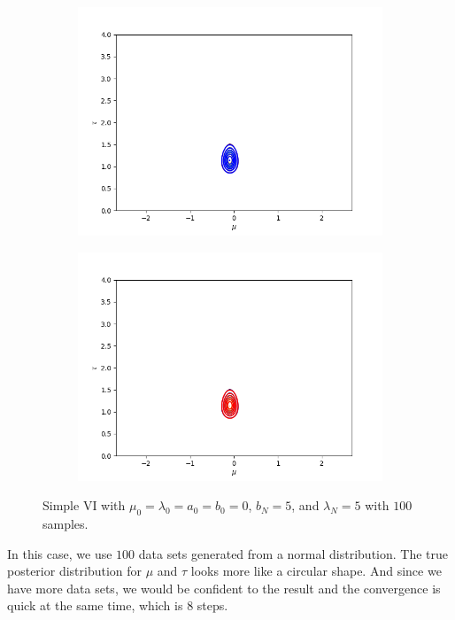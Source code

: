 \documentclass[11pt]{extarticle}
\newcommand{\0}{\mathbf{0}}
\renewcommand{\(}{\left(}
\renewcommand{\)}{\right)}
\theoremstyle{definition}
\begin{document}
\begin{enumerate}
\begin{figure}[!ht]
\begin{subfigure}{.4\textwidth}
			\centering
			\includegraphics[width=\linewidth]{2_4_3_3}
		\end{subfigure}
		\begin{subfigure}{.4\textwidth}
			\centering
			\includegraphics[width=\linewidth]{2_4_3_8}
		\end{subfigure}
		\caption{Simple VI with $\mu_{0} = \lambda_{0} = a_{0} = b_{0} = 0$, $b_{N} = 5$, and $\lambda_{N} = 5$ with $100$ samples.}
		\label{fig:2_4_3}
	\end{figure}
	\par In this case, we use $100$ data sets generated from a normal distribution. The true posterior distribution for $\mu$ and $\tau$ looks more like a circular shape. And since we have more data sets, we would be confident to the result and the convergence is quick at the same time, which is $8$ steps.
\end{enumerate}
\end{document}
